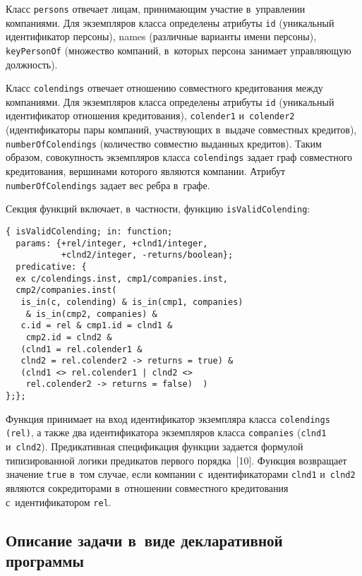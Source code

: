 \begin{multicols}{2}
      Класс \verb"persons" отвечает лицам, принимающим участие 
в~управлении компаниями. Для экземпляров класса определены атрибуты 
\verb"id" (уникальный идентификатор персоны), names (различные варианты 
имени персоны), \verb"keyPersonOf" (множество компаний, в~которых персона 
занимает управ\-ля\-ющую должность).
      
      Класс \verb"colendings" отвечает отношению совместного кредитования 
между компаниями. Для экземпляров класса определены атрибуты \verb"id" 
(уникальный идентификатор отношения кредитования), \verb"colender1" 
и~\verb"colender2" (идентификаторы пары компаний, участвующих в~выдаче 
совместных кредитов), \verb"numberOfColendings" (количество совместно 
выданных кредитов). Таким образом, совокупность экземпляров класса 
\verb"colendings" задает граф совместного кредитования, вершинами которого 
являются компании. Атрибут \verb"numberOfColendings" задает вес ребра 
в~графе.
      
      Секция функций включает, в~частности, функцию 
\verb"isValidColending":

\vspace*{-3pt}

\noindent
     {\small \begin{verbatim}
{ isValidColending; in: function;
  params: {+rel/integer, +clnd1/integer,
           +clnd2/integer, -returns/boolean};
  predicative: {
  ex c/colendings.inst, cmp1/companies.inst, 
  cmp2/companies.inst(
   is_in(c, colending) & is_in(cmp1, companies) 
    & is_in(cmp2, companies) &
   c.id = rel & cmp1.id = clnd1 & 
    cmp2.id = clnd2 &
   (clnd1 = rel.colender1 & 
   clnd2 = rel.colender2 -> returns = true) &
   (clnd1 <> rel.colender1 | clnd2 <>
    rel.colender2 -> returns = false)  )
};};
\end{verbatim}
}
      
      Функция принимает на вход идентификатор экземпляра класса 
\verb"colendings (rel)", а также два идентификатора экземпляров класса 
\verb"companies" (\verb"clnd1" и~\verb"clnd2"). Предикативная спецификация функции 
задается формулой типизированной логики предикатов первого порядка~[10]. 
Функция возвращает значение \verb"true" в~том случае, если компании 
с~идентификаторами \verb"clnd1" и~\verb"clnd2" являются сокредиторами 
в~отношении совместного кредитования с~идентификатором \verb"rel".

\vspace*{-4pt}
      
\subsection{Описание задачи в~виде декларативной программы}


\end{multicols}
